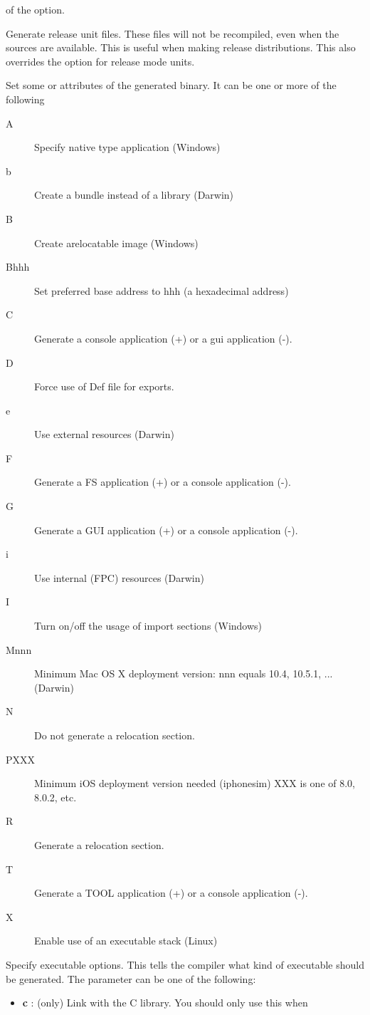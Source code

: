 \begin{description}
of the  option.
\item [-Ur]  Generate release unit files. These files will not be
recompiled, even when the sources are available. This is useful when making
release distributions. This also overrides the  option for release 
mode units.
\item[-W] Set some \windows or \ostwo attributes of the generated binary. It
can be one or more of the following
\begin{description}
\item[A] Specify native type application (Windows)
\item[b] Create a bundle instead of a library (Darwin)
\item[B] Create arelocatable image (Windows)
\item[Bhhh] Set preferred base address to hhh (a hexadecimal address)
\item[C] Generate a console application (+) or a gui application (-).
\item[D] Force use of Def file for exports.
\item[e] Use external resources (Darwin)
\item[F] Generate a FS application (+) or a console application (-).
\item[G] Generate a GUI application (+) or a console application (-).
\item[i] Use internal (FPC) resources (Darwin)
\item[I] Turn on/off the usage of import sections (Windows)
\item[Mnnn] Minimum Mac OS X deployment version: nnn equals 10.4, 10.5.1, ... (Darwin)
\item[N] Do not generate a relocation section.
\item[PXXX] Minimum iOS deployment version needed (iphonesim) XXX is one of 8.0, 8.0.2, etc.
\item[R] Generate a relocation section.
\item[T] Generate a TOOL application (+) or a console application (-).
\item[X] Enable use of an executable stack (Linux)
\end{description}
\item [-Xx]  Specify executable options. This tells the compiler what
kind of executable should be generated. The parameter 
can be one of the following:
\begin{itemize}
\item \textbf{c} : (\linux only) Link with the C library. You should only use this when

\end{itemize}
\end{description}
